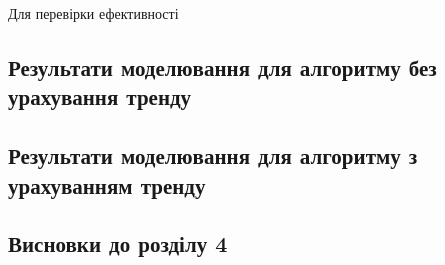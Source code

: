 \newpage
{}
    Для перевірки ефективності \TBD

\subsection{Результати моделювання для алгоритму без урахування тренду}
    \TBD
\subsection{Результати моделювання для алгоритму з урахуванням тренду}
    \TBD
\newpage
\subsection*{Висновки до розділу 4}
    \TBD
